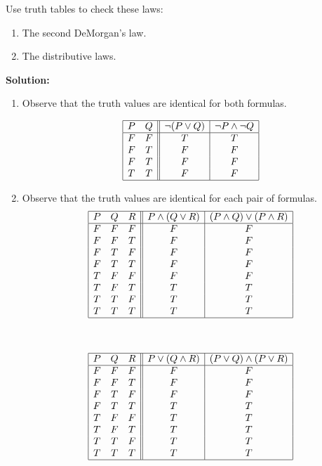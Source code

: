 Use truth tables to check these laws:
\begin{enumerate}[label=(\alph*)]
    \item The second DeMorgan's law.
    \item The distributive laws.
\end{enumerate}

\textbf{Solution:}
\begin{enumerate}[label=(\alph*)]
    \item Observe that the truth values are identical for both formulas.
    
\[
\begin{array}{|cc||c|c|}
\hline
P & Q & \neg (P \vee Q) & \neg P \wedge \neg Q\\
\hline
F & F & T & T \\
F & T & F & F \\
F & T & F & F \\
T & T & F & F \\
\hline
\end{array}
\]

\item Observe that the truth values are identical for each pair of formulas.
\[
\begin{array}{|ccc||c|c|}
\hline
P & Q & R & P \wedge (Q \vee R) & (P \wedge Q) \vee (P \wedge R) \\
\hline
F & F & F & F & F \\
F & F & T & F & F \\
F & T & F & F & F \\
F & T & T & F & F \\
T & F & F & F & F \\
T & F & T & T & T \\
T & T & F & T & T \\
T & T & T & T & T \\
\hline
\end{array}
\]

\

\[
\begin{array}{|ccc||c|c|}
\hline
P & Q & R & P \vee (Q \wedge R) & (P \vee Q) \wedge (P \vee R) \\
\hline
F & F & F & F & F \\
F & F & T & F & F \\
F & T & F & F & F \\
F & T & T & T & T \\
T & F & F & T & T \\
T & F & T & T & T \\
T & T & F & T & T \\
T & T & T & T & T \\
\hline
\end{array}
\]
\end{enumerate}

\pagebreak